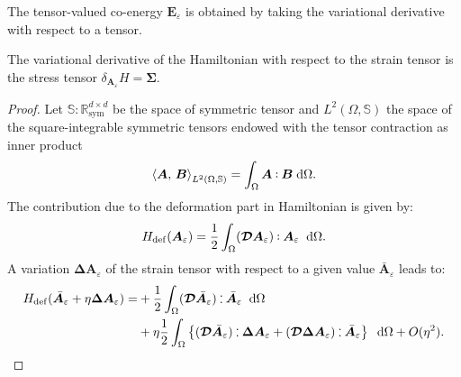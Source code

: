 The tensor-valued co-energy $\bm{E}_\varepsilon$ is obtained by taking the variational derivative with respect to a tensor.
\begin{proposition}\label{prop:varder_tens}
	The variational derivative of the Hamiltonian with respect to the strain tensor is the stress tensor $\delta_{\bm{A}_{\varepsilon}}H = \bm{\Sigma}$.
	\begin{proof}
		Let $\mathbb{S}: \mathbb{R}^{d\times d}_{\text{sym}}$ be the space of symmetric tensor and  $L^2(\Omega, \mathbb{S})$ the space of the square-integrable symmetric tensors endowed with the tensor contraction as inner product
		\begin{equation}\label{eq:normL2sym}
		\inner[L^2(\Omega, \mathbb{S})]{\bm{A}}{\bm{B}} = \int_{\Omega} \bm{A} \cddot \bm{B} \d\Omega. 
		\end{equation}
		The contribution due to the deformation part in Hamiltonian is given by:		\begin{equation*}
		H_{\mathrm{def}}(\bm{A}_{\varepsilon}) = \frac{1}{2} \int_{\Omega} (\bm{\mathcal{D}} \bm{A}_{\varepsilon}) \cddot \bm{A}_{\varepsilon}  \; \d\Omega. 
		\end{equation*}
		A variation $\bm{\Delta}\bm{A}_{\varepsilon}$ of the strain tensor with respect to a given value $\bar{\bm{A}}_{\varepsilon}$ leads to:
		\begin{align*}
		H_{\mathrm{def}}(\bar{\bm{A}}_{\varepsilon} + \eta \bm{\Delta}\bm{A}_{\varepsilon}) = &+\frac{1}{2} \int_{\Omega} (\bm{\mathcal{D}} \bar{\bm{A}}_{\varepsilon}) \cddot \bar{\bm{A}}_{\varepsilon} \; \d\Omega \\
		&+ \eta \frac{1}{2} \int_{\Omega} \left\{ (\bm{\mathcal{D}} \bar{\bm{A}}_{\varepsilon}) \cddot \bm{\Delta}\bm{A}_{\varepsilon}
		+ (\bm{\mathcal{D}} \bm{\Delta}\bm{A}_{\varepsilon}) \cddot \bar{\bm{A}}_{\varepsilon}\right\}\; \d\Omega  + O(\eta^2).
		\end{align*}


\end{proof}
\end{proposition}
